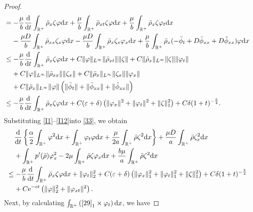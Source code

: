 \documentclass[11pt]{article}
\theoremstyle{plain}
\numberwithin{equation}{section}
\begin{document}
\begin{proof}
\begin{align}
			&=-\frac{\mu}{b}	\frac{{\rm d}}{{\rm d}t}\int_{\mathbb{R}^+}\bar\rho_x\zeta \varphi{\rm d}x+\frac{\mu}{b}\int_{\mathbb{R}^+}\bar\rho_{xt}\zeta \varphi{\rm d}x+\frac{\mu}{b}\int_{\mathbb{R}^+}\bar\rho_x\zeta \varphi_t{\rm d}x\notag\\
			&\;\;\;\;-\frac{\mu D}{b}\int_{\mathbb{R}^+}\bar\rho_{xx}\zeta_x\varphi{\rm d}x-\frac{\mu D}{b}\int_{\mathbb{R}^+}\bar\rho_x\zeta_x\varphi_x{\rm d}x+\frac{\mu}{b}\int_{\mathbb{R}^+}\bar\rho_x(-\bar\phi_t+D\bar\phi_{xx}+D\hat\phi_{xx})\varphi{\rm d}x\notag\\
			&\leq -\frac{\mu}{b}	\frac{{\rm d}}{{\rm d}t}\int_{\mathbb{R}^+}\bar\rho_x\zeta \varphi{\rm d}x+C\|\varphi\|_{L^{\infty}}\|\bar\rho_{xt}\|\|\zeta\|+C\|\bar\rho_x\|_{L^{\infty}}\|\zeta\|\|\varphi_t\|\notag\\	
			&\;\;\;\;+C\|\varphi\|_{L^{\infty}}\|\bar\rho_{xx}\|\|\zeta_x\|+C\|\bar\rho_x\|_{L^{\infty}}\|\zeta_x\|\|\varphi_x\|\notag\\
			&\;\;\;\;+C\|\bar\rho_x\|_{L^{\infty}}\|\varphi\|\left(\|\bar\phi_t\|+\|\bar\phi_{xx}\|+\|\hat\phi_{xx}\|\right)\notag\\
			&\leq  -\frac{\mu}{b} 	\frac{{\rm d}}{{\rm d}t} \int_{\mathbb{R}^+}\bar\rho_x\zeta \varphi{\rm d}x+C(\varepsilon+\delta)\left(\|\varphi_x\|^2+\|\varphi_t\|^2+\|\zeta\|_1^2\right) +C\delta(1+t)^{-\frac{5}{4}}.
		\end{align}
		Substituting  \eqref{I1}--\eqref{I12}into \eqref{33}, we obtain
		\begin{align}\label{34}
			&\;\;\;\;	\frac{{\rm d}}{{\rm d}t}\left\{\frac{\alpha}{2}\int_{\mathbb{R}^+}\varphi^2{\rm d}x+\int_{\mathbb{R}^+}\varphi_t\varphi{\rm d}x+\frac{\mu}{2a}\int_{\mathbb{R}^+}\bar\rho\zeta^2{\rm d}x\right\}+\frac{\mu D}{a}\int_{\mathbb{R}^+}\bar\rho\zeta_x^2{\rm d}x\notag\\
			&\;\;\;\;+\int_{\mathbb{R}^+}p^{\prime}(\bar\rho)\varphi_x^2-2\mu\int_{\mathbb{R}^+}\bar\rho\zeta\varphi_x{\rm d}x+\frac{b\mu}{a}\int_{\mathbb{R}^+}\bar\rho\zeta^2{\rm d}x\notag\\
			&\leq -\frac{\mu}{b}	\frac{{\rm d}}{{\rm d}t}\int_{\mathbb{R}^+}\bar\rho_x\zeta \varphi{\rm d}x+\|\varphi_t\|_2^2+C(\varepsilon+\delta)\left(\|\varphi_x\|_1^2+\|\varphi_t\|_1^2+\|\zeta\|_1^2\right)+C\delta(1+t)^{-\frac{5}{4}}\notag\\
			&\;\;\;\;+C{\rm e}^{-ct}\left(\|\varphi\|_2^2+\|\varphi_{xt}\|^2\right).
		\end{align}
		Next, by calculating $\int_{\mathbb{R}^+}\left(\eqref{29}_1\times\varphi_t\right){\rm d}x$, we have

\end{proof}
\end{document}
